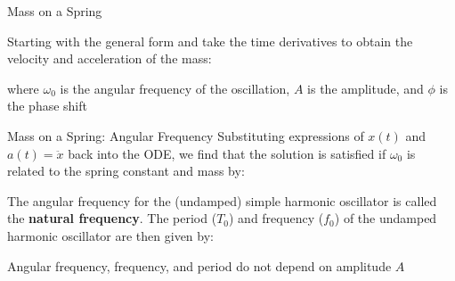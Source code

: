 \documentclass[12pt,compress,aspectratio=169]{beamer}
\begin{document}
\begin{frame}{Mass on a Spring}

  
  Starting with the general form and take the time derivatives to obtain the
  velocity and acceleration of the mass:
 
  \vspace{-.2in}{\large
    \begin{align*}
      x(t)&=A\cos(\omega_0 t-\phi)\\
      v(t)&=-A\omega_0\sin(\omega_0 t-\phi)\\
      a(t)&=-A\omega_0^2\cos(\omega_0 t-\phi)=-\omega_0^2x
    \end{align*}
  }
  
  where $\omega_0$ is the angular frequency of the oscillation, $A$ is the
  amplitude, and $\phi$ is the phase shift
\end{frame}



\begin{frame}{Mass on a Spring: Angular Frequency}
  Substituting expressions of $x(t)$ and $a(t)=\ddot x$ back into the ODE, we
  find that the solution is satisfied if $\omega_0$ is related to the spring
  constant and mass by:


  The angular frequency for the (undamped) simple harmonic oscillator is called
  the \textbf{natural frequency}. The period ($T_0$) and frequency ($f_0$) of
  the undamped harmonic oscillator are then given by:

  
  Angular frequency, frequency, and period do not depend on amplitude $A$
\end{frame}
\end{document}
